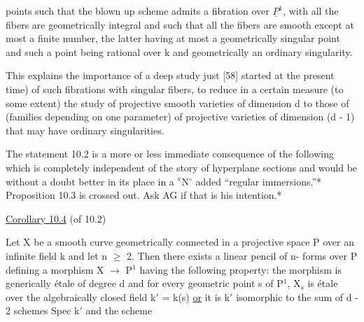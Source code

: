 
points such that the blown up scheme admits a fibration over $\underline{P}^1$,
with all the fibers are geometrically integral and such that all
the fibers are smooth except at most a finite number, the latter
having at most a geometrically singular point and such a point
being rational over k and geometrically an ordinary singularity.

This explains the importance of a deep study just [58]
started at the present time) of such fibrations with singular
fibers, to reduce in a certain measure (to some extent) the study
of projective smooth varieties of dimension d to those of
(families depending on one parameter) of projective varieties of
dimension (d - 1) that may have ordinary singularities.

The statement 10.2 is a more or less immediate consequence of
the following which is completely independent of the story of
hyperplane sections and would be without a doubt better in its
place in a ${}^{\mathrm{v}}$N$^{\circ}$ added ``regular immersions.''*
Proposition 10.3 is crossed out.  Ask AG if that is his
intention.*

\uline{Corollary 10.4} (of 10.2)

Let X be a smooth curve geometrically connected in a
projective space P over an infinite field k and let n $\geq$ 2.  Then
there exists a linear pencil of n- forms over P defining a
morphism X $\to$ P$^1$ having the following property:  the morphism is
generically étale of degree d and for every geometric point s of
P$^1$, X$_s$ is étale over the algebraically closed field k$'$ = k(s) \uline{or} it
is k$'$ isomorphic to the sum of d - 2 schemes Spec k$'$ and the scheme

